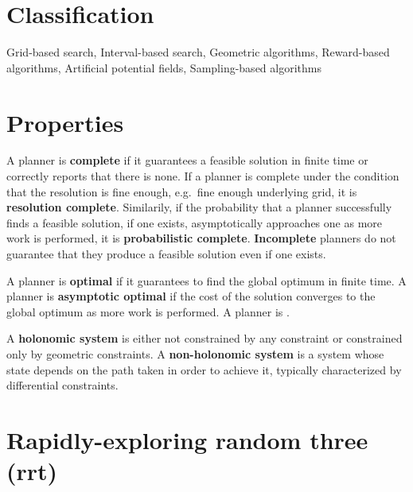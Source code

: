 \section{Classification}
Grid-based search, Interval-based search, Geometric algorithms, Reward-based algorithms, Artificial potential fields, Sampling-based algorithms

\section{Properties}






\begin{definition}
A planner is \textbf{complete} if it guarantees a feasible solution in finite time or correctly reports that there is none. If a planner is complete under the condition that the resolution is fine enough, e.g.\ fine enough underlying grid, it is \textbf{resolution complete}. Similarily, if the probability that a planner successfully finds a feasible solution, if one exists, asymptotically approaches one as more work is performed, it is \textbf{probabilistic complete}. \textbf{Incomplete} planners do not guarantee that they produce a feasible solution even if one exists.
\end{definition}

\begin{definition}[Optimality]
A planner is \textbf{optimal} if it guarantees to find the global optimum in finite time. A planner is \textbf{asymptotic optimal} if the cost of the solution converges to the global optimum as more work is performed. A planner is \textbf{}.
\end{definition}

\begin{definition}
\end{definition}

\begin{definition}[System]
  A \textbf{holonomic system} is either not constrained by any constraint or constrained only by geometric constraints.  A \textbf{non-holonomic system} is a system whose state depends on the path taken in order to achieve it, typically characterized by differential constraints.
\end{definition}



\section{Rapidly-exploring random three (\gls{rrt})}

